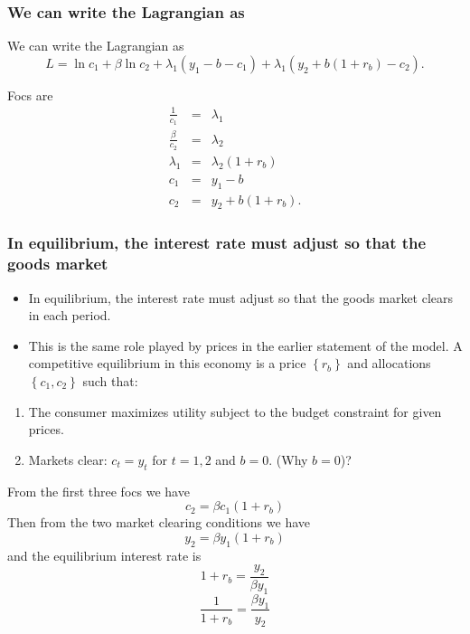 \documentclass[aspectratio=169]{ltx-talk}
\begin{document}
\begin{frame}
\frametitle{We can write the Lagrangian as}
We can write the Lagrangian as 
\begin{equation*}
L=\ln c_{1}+\beta \ln c_{2}+\lambda _{1}\left( y_{1}-b-c_{1}\right) +\lambda
_{1}\left( y_{2}+b\left( 1+r_{b}\right) -c_{2}\right) .
\end{equation*}

Focs are 
\begin{eqnarray*}
\frac{1}{c_{1}} &=&\lambda _{1} \\
\frac{\beta }{c_{2}} &=&\lambda _{2} \\
\lambda _{1} &=&\lambda _{2}\left( 1+r_{b}\right) \\
c_{1} &=&y_{1}-b \\
c_{2} &=&y_{2}+b\left( 1+r_{b}\right) .
\end{eqnarray*}%
\end{frame}

\begin{frame}
\frametitle{In equilibrium, the interest rate must adjust so that the goods market}
\begin{itemize}
\item In equilibrium, the interest rate must adjust so that the goods market
clears in each period.

\item This is the same role played by prices in the earlier statement of the
model. A competitive equilibrium in this economy is a price $\left\{
r_{b}\right\} $ and allocations $\left\{ c_{1},c_{2}\right\} $ such that:
\end{itemize}

\begin{enumerate}
\item The consumer maximizes utility subject to the budget constraint for
given prices.

\item Markets clear: $c_{t}=y_{t}$ for $t=1,2$ and $b=0$. (Why $b=0$)?
\end{enumerate}

From the first three focs we have%
\begin{equation*}
c_{2}=\beta c_{1}\left( 1+r_{b}\right)
\end{equation*}%
Then from the two market clearing conditions we have%
\begin{equation*}
y_{2}=\beta y_{1}\left( 1+r_{b}\right)
\end{equation*}%
and the equilibrium interest rate is%
\begin{equation*}
1+r_{b}=\frac{y_{2}}{\beta y_{1}}
\end{equation*}%
\begin{equation*}
\frac{1}{1+r_{b}}=\frac{\beta y_{1}}{y_{2}}
\end{equation*}%
\end{frame}
\end{document}

